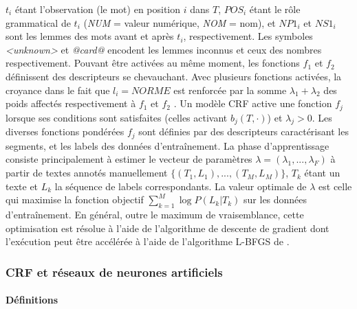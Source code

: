 $t_i$ étant l'observation (le mot) en position $i$ dans $T$, $POS_i$ étant le rôle grammatical de $t_i$ (\textit{NUM} = valeur numérique, \textit{NOM} = nom), et $NP1_i$ et $NS1_i$ sont les lemmes des mots avant et après $t_i$, respectivement. Les symboles \textit{<unknown>} et \textit{@card@} encodent les lemmes inconnus et ceux des nombres respectivement. Pouvant être activées au même moment, les fonctions $f_1$ et $f_2$ définissent des descripteurs se chevauchant. Avec plusieurs fonctions activées, la croyance dans le fait que $l_i = NORME$ est renforcée par la somme $\lambda_1 + \lambda_2$ des poids affectés respectivement à $f_1$ et $f_2$ \citep{Zhu2010CRFlecture}.  Un modèle CRF active une fonction $f_j$ lorsque ses conditions sont satisfaites (celles activant $b_j(T,\cdot)$) et $\lambda_j > 0$. Les diverses fonctions pondérées $f_j$ sont définies par des descripteurs caractérisant les segments, et les labels des données d'entraînement. La phase d'apprentissage consiste principalement à estimer le vecteur de paramètres $\lambda = (\lambda_1,...,\lambda_F)$ à partir de textes annotés manuellement $ \lbrace (T_1, L_1), ..., (T_M, L_M) \rbrace $, $ T_k $ étant un texte et $ L_k $ la séquence de labels correspondants. La valeur optimale de $\lambda$ est celle qui maximise la fonction objectif   
$\sum\limits_ {k = 1} ^ M \log P (L_k \vert T_k) $ sur les données d'entraînement. En général, outre le maximum de vraisemblance, cette optimisation est résolue à l'aide de l'algorithme de descente de gradient dont l'exécution peut être accélérée à l'aide de l'algorithme L-BFGS de \citet{liu1989l-bfgs}.

\subsubsection{CRF et réseaux de neurones artificiels}
\paragraph{Définitions}

